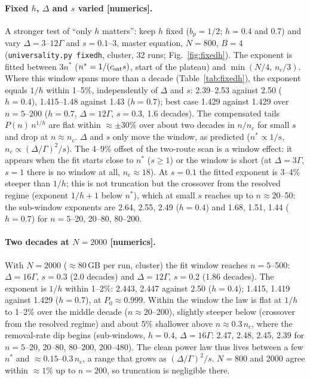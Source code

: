 \documentclass[11pt,a4paper]{article}
\begin{document}
\paragraph{Fixed $h$, $\Delta$ and $s$ varied [numerics].} A stronger test of ``only $h$ matters'': keep $h$ fixed ($b_p=1/2$; $h=0.4$ and 0.7) and vary $\Delta=3$--$12\Gamma$ and $s=0.1$--3, master equation, $N=800$, $B=4$ (\texttt{universality.py fixedh}, cluster, 32 runs; Fig.~\ref{fig:fixedh}). The exponent is fitted between $3n^*$ ($n^*=1/(c_{\rm sat}s)$, start of the plateau) and $\min(N/4,\,n_c/3)$. Where this window spans more than a decade (Table~\ref{tab:fixedh}), the exponent equals $1/h$ within 1--5\%, independently of $\Delta$ and $s$: 2.39--2.53 against 2.50 ($h=0.4$), 1.415--1.48 against 1.43 ($h=0.7$); best case 1.429 against 1.429 over $n=5$--200 ($h=0.7$, $\Delta=12\Gamma$, $s=0.3$, 1.6 decades). The compensated tails $P(n)\,n^{1/h}$ are flat within $\approx\pm30\%$ over about two decades in $n/n_c$ for small $s$ and drop at $n\approx n_c$. $\Delta$ and $s$ only move the window, as predicted ($n^*\propto1/s$, $n_c\propto(\Delta/\Gamma)^2/s$). The 4--9\% offset of the two-route scan is a window effect: it appears when the fit starts close to $n^*$ ($s\ge1$) or the window is short (at $\Delta=3\Gamma$, $s=1$ there is no window at all, $n_c\approx18$). At $s=0.1$ the fitted exponent is 3--4\% steeper than $1/h$; this is not truncation but the crossover from the resolved regime (exponent $1/h+1$ below $n^*$), which at small $s$ reaches up to $n\approx20$--50: the sub-window exponents are 2.64, 2.55, 2.49 ($h=0.4$) and 1.68, 1.51, 1.44 ($h=0.7$) for $n=5$--20, 20--80, 80--200.

\paragraph{Two decades at $N=2000$ [numerics].} With $N=2000$ ($\approx80$\,GB per run, cluster) the fit window reaches $n=5$--500: $\Delta=16\Gamma$, $s=0.3$ (2.0 decades) and $\Delta=12\Gamma$, $s=0.2$ (1.86 decades). The exponent is $1/h$ within 1--2\%: 2.443, 2.447 against 2.50 ($h=0.4$); 1.415, 1.419 against 1.429 ($h=0.7$), at $P_0\approx0.999$. Within the window the law is flat at $1/h$ to 1--2\% over the middle decade ($n\approx20$--200), slightly steeper below (crossover from the resolved regime) and about 5\% shallower above $n\approx0.3\,n_c$, where the removal-rate dip begins (sub-windows, $h=0.4$, $\Delta=16\Gamma$: 2.47, 2.48, 2.45, 2.39 for $n=5$--20, 20--80, 80--200, 200--480). The clean power law thus lives between a few $n^*$ and $\approx0.15$--$0.3\,n_c$, a range that grows as $(\Delta/\Gamma)^2/s$. $N=800$ and 2000 agree within $\approx1\%$ up to $n=200$, so truncation is negligible there.
\end{document}
